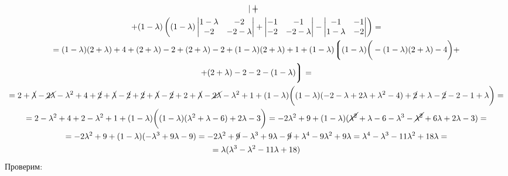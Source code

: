 \begin{multline*}
\begin{vmatrix}
    \end{vmatrix} + \\
    + (1 - \lambda) \left( (1 - \lambda)
    \begin{vmatrix}
    	1 - \lambda & -2 \\
        -2 & -2 - \lambda
    \end{vmatrix} +
    \begin{vmatrix}
    	-1 & -1 \\
        -2 & -2 - \lambda
    \end{vmatrix} -
    \begin{vmatrix}
    	-1 & -1 \\
        1 - \lambda & -2
    \end{vmatrix} \right) = \\
    = (1 - \lambda)(2 + \lambda) + 4 + (2 + \lambda) - 2 + (2 + \lambda) - 2 + (1 - \lambda)(2 + \lambda) + 1 + (1 - \lambda) \bigg\lgroup (1 - \lambda) \bigg( -(1 - \lambda)(2 + \lambda) - 4 \bigg) + \\
    + (2 + \lambda) - 2 - 2 - (1 - \lambda) \bigg\rgroup = \\
    = 2 + \cancel\lambda - \cancel{2\lambda} - \lambda^2 + 4 + \cancel2 + \cancel\lambda - \cancel2 + \cancel2 + \cancel\lambda - \cancel2 + 2 + \cancel\lambda - \cancel{2\lambda} - \lambda^2 + 1 + (1 - \lambda) \bigg( (1 - \lambda)(-2 - \lambda + 2\lambda + \lambda^2 - 4) + \cancel2 + \lambda - \cancel2 - 2 - 1 + \lambda \bigg) = \\
    = 2 - \lambda^2 + 4 + 2 - \lambda^2 + 1 + (1 - \lambda) \bigg( (1 - \lambda)(\lambda^2 + \lambda - 6) + 2\lambda - 3 \bigg) = -2\lambda^2 + 9 + (1 - \lambda)(\cancel{\lambda^2} + \lambda - 6 - \lambda^3 - \cancel{\lambda^2} + 6\lambda + 2\lambda - 3) = \\
    = -2\lambda^2 + 9 + (1 - \lambda)(-\lambda^3 + 9\lambda - 9) = -2\lambda^2 + \cancel9 - \lambda^3 + 9\lambda - \cancel9 + \lambda^4 - 9\lambda^2 + 9\lambda = \lambda^4 - \lambda^3 - 11\lambda^2 + 18\lambda = \\
    = \lambda(\lambda^3 - \lambda^2 - 11\lambda + 18)
\end{multline*}
Проверим:
